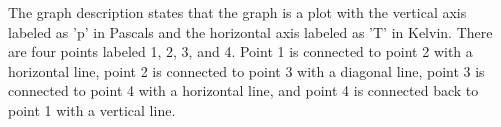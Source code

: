 The graph description states that the graph is a plot with the vertical axis labeled as 'p' in Pascals and the horizontal axis labeled as 'T' in Kelvin. There are four points labeled 1, 2, 3, and 4. Point 1 is connected to point 2 with a horizontal line, point 2 is connected to point 3 with a diagonal line, point 3 is connected to point 4 with a horizontal line, and point 4 is connected back to point 1 with a vertical line.